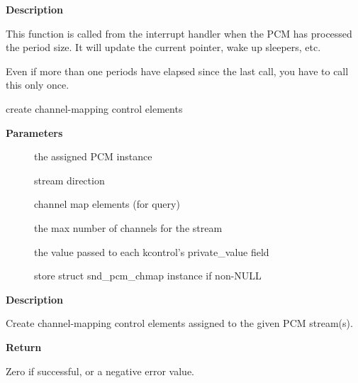\documentclass[a4paper,8pt,english]{sphinxmanual}
\begin{document}
\textbf{Description}

This function is called from the interrupt handler when the
PCM has processed the period size.  It will update the current
pointer, wake up sleepers, etc.

Even if more than one periods have elapsed since the last call, you
have to call this only once.

\begin{fulllineitems}
\label{sound/kernel-api/alsa-driver-api:c.snd_pcm_add_chmap_ctls}
create channel-mapping control elements

\end{fulllineitems}


\textbf{Parameters}
\begin{description}
\item[{}] \leavevmode
the assigned PCM instance

\item[{}] \leavevmode
stream direction

\item[{}] \leavevmode
channel map elements (for query)

\item[{}] \leavevmode
the max number of channels for the stream

\item[{}] \leavevmode
the value passed to each kcontrol's private\_value field

\item[{}] \leavevmode
store struct snd\_pcm\_chmap instance if non-NULL

\end{description}

\textbf{Description}

Create channel-mapping control elements assigned to the given PCM stream(s).

\textbf{Return}

Zero if successful, or a negative error value.
\end{document}
